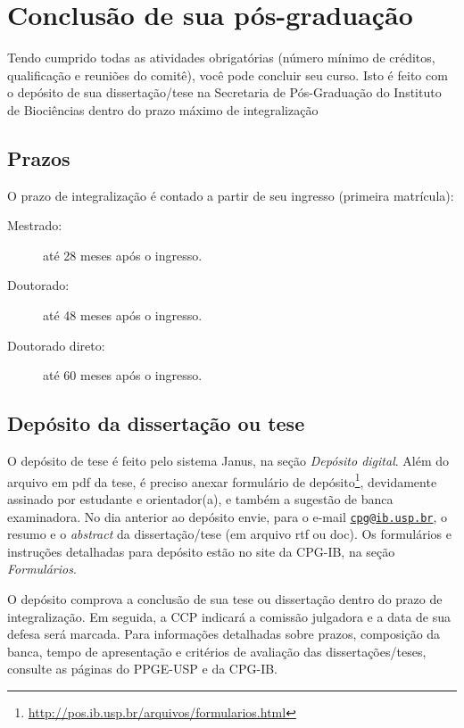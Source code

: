 \section{Conclusão de sua pós-graduação}
\label{sec:conclusao}

Tendo cumprido todas as atividades obrigatórias (número mínimo de
créditos, qualificação e reuniões do comitê), você pode concluir seu
curso. Isto é feito com o depósito de sua dissertação/tese na
Secretaria de Pós-Graduação do Instituto de Biociências dentro do
prazo máximo de integralização

\subsection{Prazos}

O prazo de integralização é contado a partir de seu ingresso
(primeira matrícula):

\begin{description}
\item[Mestrado:] até 28 meses após o ingresso.
\item[Doutorado:] até 48 meses após o ingresso.
\item[Doutorado direto:] até 60 meses após o ingresso.
\end{description}

\subsection{Depósito da dissertação ou tese}
\label{sec:depos-da-diss}

O depósito de tese é feito pelo sistema Janus, na seção \emph{Depósito
  digital}. Além do arquivo em pdf da tese, é preciso anexar
formulário de
depósito\footnote{\url{http://pos.ib.usp.br/arquivos/formularios.html}},
devidamente assinado por estudante e orientador(a), e também a
sugestão de banca examinadora. No dia anterior ao depósito envie, para
o e-mail \href{mailto:cpg@ib.usp.br}{\nolinkurl{cpg@ib.usp.br}}, o
resumo e o \emph{abstract} da dissertação/tese (em arquivo rtf ou
doc). Os formulários e instruções detalhadas para depósito estão no
site da CPG-IB, na seção \emph{Formulários}.

O depósito comprova a conclusão de sua tese ou dissertação dentro do
prazo de integralização. Em seguida, a CCP indicará a comissão
julgadora e a data de sua defesa será marcada. Para informações
detalhadas sobre prazos, composição da banca, tempo de apresentação e
critérios de avaliação das dissertações/teses, consulte as páginas do
PPGE-USP e da CPG-IB.

